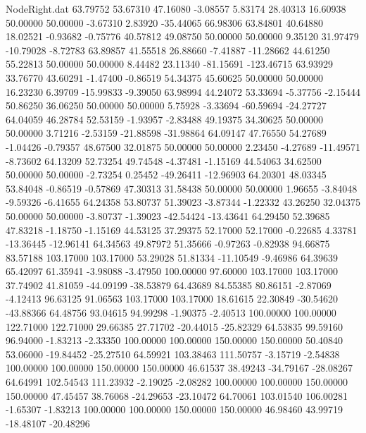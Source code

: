 \begin{filecontents}{NodeRight.dat}
  63.79752   53.67310   47.16080    -3.08557    5.83174   28.40313   16.60938   50.00000   50.00000   -3.67310    2.83920  -35.44065   66.98306
  63.84801   40.64880   18.02521    -0.93682   -0.75776   40.57812   49.08750   50.00000   50.00000    9.35120   31.97479  -10.79028   -8.72783
  63.89857   41.55518   26.88660    -7.41887  -11.28662   44.61250   55.22813   50.00000   50.00000    8.44482   23.11340  -81.15691 -123.46715
  63.93929   33.76770   43.60291    -1.47400   -0.86519   54.34375   45.60625   50.00000   50.00000   16.23230    6.39709  -15.99833   -9.39050
  63.98994   44.24072   53.33694    -5.37756   -2.15444   50.86250   36.06250   50.00000   50.00000    5.75928   -3.33694  -60.59694  -24.27727
  64.04059   46.28784   52.53159    -1.93957   -2.83488   49.19375   34.30625   50.00000   50.00000    3.71216   -2.53159  -21.88598  -31.98864
  64.09147   47.76550   54.27689    -1.04426   -0.79357   48.67500   32.01875   50.00000   50.00000    2.23450   -4.27689  -11.49571   -8.73602
  64.13209   52.73254   49.74548    -4.37481   -1.15169   44.54063   34.62500   50.00000   50.00000   -2.73254    0.25452  -49.26411  -12.96903
  64.20301   48.03345   53.84048    -0.86519   -0.57869   47.30313   31.58438   50.00000   50.00000    1.96655   -3.84048   -9.59326   -6.41655
  64.24358   53.80737   51.39023    -3.87344   -1.22332   43.26250   32.04375   50.00000   50.00000   -3.80737   -1.39023  -42.54424  -13.43641
  64.29450   52.39685   47.83218    -1.18750   -1.15169   44.53125   37.29375   52.17000   52.17000   -0.22685    4.33781  -13.36445  -12.96141
  64.34563   49.87972   51.35666    -0.97263   -0.82938   94.66875   83.57188  103.17000  103.17000   53.29028   51.81334  -11.10549   -9.46986
  64.39639   65.42097   61.35941    -3.98088   -3.47950  100.00000   97.60000  103.17000  103.17000   37.74902   41.81059  -44.09199  -38.53879
  64.43689   84.55385   80.86151    -2.87069   -4.12413   96.63125   91.06563  103.17000  103.17000   18.61615   22.30849  -30.54620  -43.88366
  64.48756   93.04615   94.99298    -1.90375   -2.40513  100.00000  100.00000  122.71000  122.71000   29.66385   27.71702  -20.44015  -25.82329
  64.53835   99.59160   96.94000    -1.83213   -2.33350  100.00000  100.00000  150.00000  150.00000   50.40840   53.06000  -19.84452  -25.27510
  64.59921  103.38463  111.50757    -3.15719   -2.54838  100.00000  100.00000  150.00000  150.00000   46.61537   38.49243  -34.79167  -28.08267
  64.64991  102.54543  111.23932    -2.19025   -2.08282  100.00000  100.00000  150.00000  150.00000   47.45457   38.76068  -24.29653  -23.10472
  64.70061  103.01540  106.00281    -1.65307   -1.83213  100.00000  100.00000  150.00000  150.00000   46.98460   43.99719  -18.48107  -20.48296

\end{filecontents}
